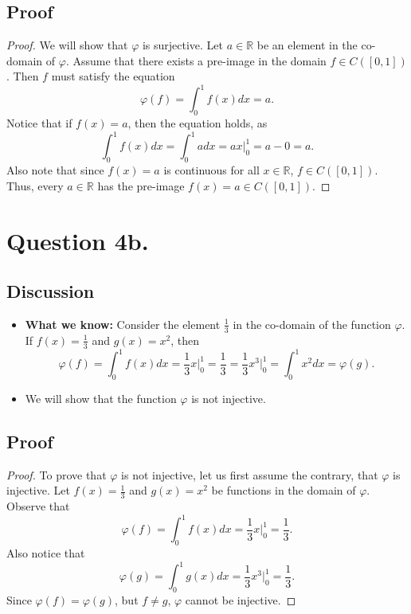 \documentclass{article}
\begin{document}
\subsection*{Proof}
\begin{proof}
    We will show that $ \varphi $ is surjective. Let $ a \in \mathbb{R} $ be an element in the co-domain of $ \varphi $. Assume that there exists a pre-image in the domain $ f \in C([0, 1]) $. Then $ f $ must satisfy the equation
    \[
        \varphi(f) = \int_{0}^{1} f(x) dx = a.
    \]
    Notice that if $ f(x) = a $, then the equation holds, as
    \[
        \int_{0}^{1} f(x) dx = \int_{0}^{1} a dx = ax \Bigr|_{0}^{1} = a - 0 = a.
    \]
    Also note that since $ f(x) = a $ is continuous for all $ x \in \mathbb{R} $, $ f \in C([0, 1]) $. Thus, every $ a \in \mathbb{R} $ has the pre-image $ f(x) = a \in C([0, 1]) $.
\end{proof}

\section*{Question 4b.}
\subsection*{Discussion}
\begin{itemize}
    \item \textbf{What we know:} Consider the element $ \frac{1}{3} $ in the co-domain of the function $ \varphi $. If $ f(x) = \frac{1}{3} $ and $ g(x) = x^2 $, then 
    \[
        \varphi(f) = \int_{0}^{1} f(x)dx = \frac{1}{3}x \Bigr|_{0}^{1} = \frac{1}{3} = \frac{1}{3} x^3 \Bigr|_{0}^{1} = \int_{0}^{1} x^2 dx = \varphi(g).
    \]
    \item We will show that the function $ \varphi $ is not injective.
\end{itemize} 

\subsection*{Proof}
\begin{proof}
    To prove that $ \varphi $ is not injective, let us first assume the contrary, that $ \varphi $ is injective. Let $ f(x) = \frac{1}{3} $ and $ g(x) = x^2 $ be functions in the domain of $ \varphi $. Observe that
    \[
        \varphi(f) = \int_{0}^{1} f(x) dx = \frac{1}{3}x \Bigr|_{0}^{1} = \frac{1}{3}.
    \]
    Also notice that
    \[
        \varphi(g) = \int_{0}^{1} g(x) dx = \frac{1}{3} x^3 \Bigr|_{0}^{1} = \frac{1}{3}.
    \]
    Since $ \varphi(f) = \varphi(g) $, but $ f \neq g $, $ \varphi $ cannot be injective.
\end{proof}
\end{document}
